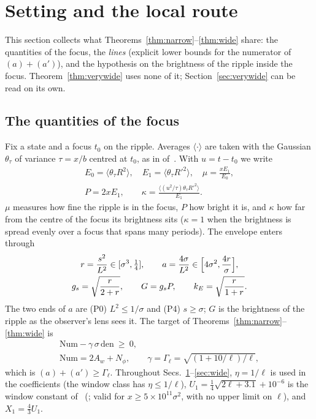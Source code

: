 \section{Setting and the local route}
\label{sec:setting}

This section collects what Theorems~\ref{thm:narrow}--\ref{thm:wide} share: the quantities of the focus, the \emph{lines} (explicit lower bounds for the numerator of $(a)+(a')$), and the hypothesis on the brightness of the ripple inside the focus.
Theorem~\ref{thm:verywide} uses none of it; Section~\ref{sec:verywide} can be read on its own.

\subsection{The quantities of the focus}

Fix a state and a focus $t_0$ on the ripple.
Averages $\langle\cdot\rangle$ are taken with the Gaussian $\theta_\tau$ of variance $\tau=x/b$ centred at $t_0$, as in  of~\cite{H}.
With $u=t-t_0$ we write
\begin{gather}
E_0=\langle\theta_\tau R^2\rangle,\quad E_1=\langle\theta_\tau R'^2\rangle,\quad \mu=\frac{xE_1}{E_0},\nonumber\\ P=2xE_1,\qquad \kappa=\frac{\langle(u^2/\tau)\theta_\tau R'^2\rangle}{E_1}.
\label{eq:focusq}
\end{gather}
$\mu$ measures how fine the ripple is in the focus, $P$ how bright it is, and $\kappa$ how far from the centre of the focus its brightness sits ($\kappa=1$ when the brightness is spread evenly over a focus that spans many periods).
The envelope enters through
\begin{gather}
r=\frac{s^2}{L^2}\in[\sigma^3,\tfrac14],\qquad a=\frac{4\sigma}{L^2}\in\Bigl[4\sigma^2,\frac{4r}{\sigma}\Bigr],\nonumber\\ g_s=\sqrt{\frac{r}{2+r}},\qquad G=g_sP,\qquad k_E=\sqrt{\frac{r}{1+r}} .
\end{gather}
The two ends of $a$ are (P0) $L^2\le1/\sigma$ and (P4) $s\ge\sigma$; $G$ is the brightness of the ripple as the observer's lens sees it.
The target of Theorems~\ref{thm:narrow}--\ref{thm:wide} is
\begin{gather}
\mathrm{Num}-\gamma\,\sigma\,\mathrm{den}\ \ge\ 0,\nonumber\\ \mathrm{Num}=2A_w+N_\phi,\qquad \gamma=\Gamma_\ell=\sqrt{(1+10/\ell)/\ell},
\label{eq:target}
\end{gather}
which is $(a)+(a')\ge\Gamma_\ell$.
Throughout Secs.~\ref{sec:setting}--\ref{sec:wide}, $\eta=1/\ell$ is used in the coefficients (the window class has $\eta\le1/\ell$), $U_1=\tfrac14\sqrt{2\ell+3.1}+10^{-6}$ is the window constant of~\cite{H} (; valid for $x\ge5\times10^{11}\sigma^2$, with no upper limit on $\ell$), and $X_1=\tfrac43U_1$.

